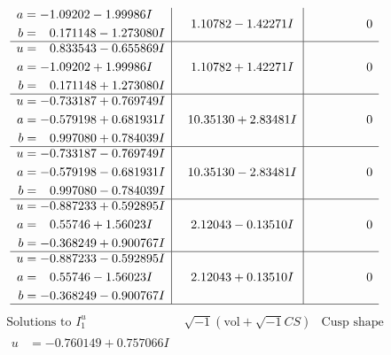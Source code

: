 \documentclass[1p]{elsarticle_modified}
\theoremstyle{definition}
\newcommand{\I}{\sqrt{-1}}
\begin{document}
$$\begin{array}{c|c|c}
\begin{aligned}
a &= -1.09202 - 1.99986 I \\
b &= \phantom{-}0.171148 - 1.273080 I\end{aligned}
 & \phantom{-}1.10782 - 1.42271 I & \phantom{-0.000000 } 0 \\ \hline\begin{aligned}
u &= \phantom{-}0.833543 - 0.655869 I \\
a &= -1.09202 + 1.99986 I \\
b &= \phantom{-}0.171148 + 1.273080 I\end{aligned}
 & \phantom{-}1.10782 + 1.42271 I & \phantom{-0.000000 } 0 \\ \hline\begin{aligned}
u &= -0.733187 + 0.769749 I \\
a &= -0.579198 + 0.681931 I \\
b &= \phantom{-}0.997080 + 0.784039 I\end{aligned}
 & \phantom{-}10.35130 + 2.83481 I & \phantom{-0.000000 } 0 \\ \hline\begin{aligned}
u &= -0.733187 - 0.769749 I \\
a &= -0.579198 - 0.681931 I \\
b &= \phantom{-}0.997080 - 0.784039 I\end{aligned}
 & \phantom{-}10.35130 - 2.83481 I & \phantom{-0.000000 } 0 \\ \hline\begin{aligned}
u &= -0.887233 + 0.592895 I \\
a &= \phantom{-}0.55746 + 1.56023 I \\
b &= -0.368249 + 0.900767 I\end{aligned}
 & \phantom{-}2.12043 - 0.13510 I & \phantom{-0.000000 } 0 \\ \hline\begin{aligned}
u &= -0.887233 - 0.592895 I \\
a &= \phantom{-}0.55746 - 1.56023 I \\
b &= -0.368249 - 0.900767 I\end{aligned}
 & \phantom{-}2.12043 + 0.13510 I & \phantom{-0.000000 } 0\\
 \hline 
 \end{array}$$\newpage$$\begin{array}{c|c|c}  
\text{Solutions to }I^u_{1}& \I (\text{vol} + \sqrt{-1}CS) & \text{Cusp shape}\\
 \hline 
\begin{aligned}
u &= -0.760149 + 0.757066 I \\

\end{aligned}
\end{array}$$
\end{document}
